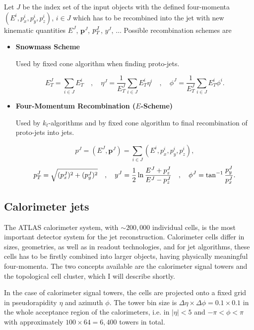 Let $J$ be the index set of the input objects with the defined four-momenta
$(E^i,p_x^i,p_y^i,p_z^i)$, $i \in J$ which has to be recombined into the jet
with new kinematic quantities $E^J$, $\mathbf{p}^J$, $p_{T}^J$, $y^J$, $\ldots$
Possible recombination schemes are

\begin{itemize}
\item \textbf{Snowmass Scheme}

Used by fixed cone algorithm when finding proto-jets.

\begin{equation}
  E_T^J = \sum_{i \in J} E_T^i
  \quad , \quad
  \eta^J = \frac{1}{E_T^J} \sum_{i \in J} E_T^i \eta^i
  \quad , \quad
  \phi^J = \frac{1}{E_T^J} \sum_{i \in J} E_T^i \phi^i.
\end{equation}

\item \textbf{Four-Momentum Recombination ($E$-Scheme)}

Used by $k_t$-algorithms and by fixed cone algorithm to final recombination of
proto-jets into jets.

\begin{equation}
  p^J = ( E^J, \mathbf{p}^J ) = \sum_{i \in J} (E^i,p_x^i,p_y^i,p_z^i),
\end{equation}
\begin{equation}
  p_{T}^J = \sqrt{(p_x^J)^2 + (p_y^J)^2}
  \quad , \quad
  y^J = \frac{1}{2} \ln \frac{E^J + p_z^J}{E^J - p_z^J}
  \quad , \quad
  \phi^J = \tan^{-1} \frac{p_y^J}{p_x^J}.
\end{equation}
\end{itemize}

\subsection{Calorimeter jets}
\label{sse:CalorimeterJets}

The ATLAS calorimeter system, with $\sim 200,000$ individual cells, is the most
important detector system for the jet reconstruction. Calorimeter cells differ
in sizes, geometries, as well as in readout technologies, and for jet algorithms,
these cells has to be firstly combined into larger objects, having physically
meaningful four-momenta. The two concepts available are the calorimeter signal
towers and the topological cell cluster, which I will describe shortly.

In the case of calorimeter signal towers, the cells are projected onto a fixed
grid in pseudorapidity $\eta$ and azimuth $\phi$. The tower bin size is $\Delta
\eta \times \Delta \phi = 0.1 \times 0.1$ in the whole acceptance region of the
calorimeters, i.e. in $|\eta| < 5$ and $- \pi < \phi < \pi$ with approximately 
$100 \times 64 = 6,400$ towers in total.

